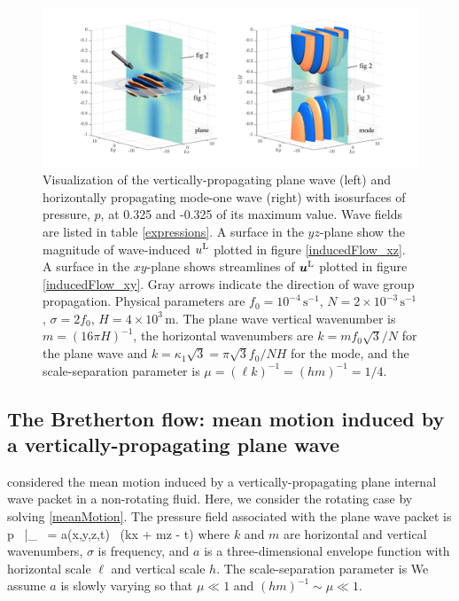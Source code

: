 \documentclass[12pt, oneside]{book}
\begin{document}
\begin{figure}
\centering
\includegraphics[width = 1\textwidth]{twoWavePackets}
\caption[Visualization of the vertically-propagating plane wave (left) and horizontally propagating mode-one wave (right)]{Visualization of the vertically-propagating plane wave (left) and horizontally propagating mode-one wave (right) with isosurfaces of pressure, $p$, at 0.325 and -0.325 of its maximum value.  Wave fields are listed in table \ref{expressions}.  A surface in the $yz$-plane show the magnitude of wave-induced $u^{\mathrm{L}}$ plotted in figure \ref{inducedFlow_xz}.  A surface in the $xy$-plane shows streamlines of $\boldsymbol{u}^{\mathrm{L}}$ plotted in figure \ref{inducedFlow_xy}.    Gray arrows indicate the direction of wave group propagation.  Physical parameters are $f_0=10^{-4} \, \mathrm{s^{-1}}$,  $N = 2\times 10^{-3} \, \mathrm{s^{-1}}$, $\sigma = 2 f_0$, $H = 4 \times 10^{3} \, \mathrm{m}$.  The plane wave vertical wavenumber is $m=(16\pi H)^{-1}$, the horizontal wavenumbers are $k = m f_0 \sqrt{3} / N$  for the plane wave and $k = \kappa_1 \sqrt{3} = \pi \sqrt{3} f_0 / N H$ for the mode, and the scale-separation parameter is $\mu = (\ell k)^{-1} = (h m)^{-1} =1/4$.}
\label{twoWavePackets}
\end{figure}

\subsection{The Bretherton flow: mean motion induced by a vertically-propagating plane wave}

\cite{Bretherton} considered the mean motion induced by a vertically-propagating plane internal wave packet in a non-rotating fluid. Here, we consider the rotating case by solving \eqref{meanMotion}.  The pressure field associated with the plane wave packet is
\beq
p  \, \big |_{}  \, = \; a(x,y,z,t) \, \cos (kx + mz - \sigma t) \com 
\label{packet}
\eeq
where $k$ and $m$ are horizontal and vertical wavenumbers, $\sigma$ is frequency, and $a$ is a three-dimensional envelope function with horizontal scale $\ell$ and vertical scale $h$.  The scale-separation parameter is
\beq
\mu {} {} \per
\label{slowlyvarying}
\eeq
We assume $a$ is slowly varying so that $\mu \ll 1$ and $(hm)^{-1} \sim \mu \ll 1$.
\end{document}
